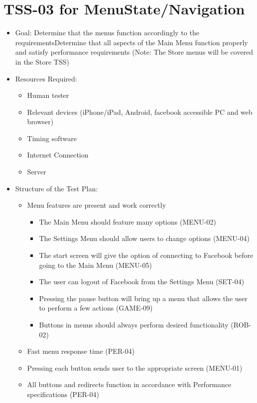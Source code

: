 \section{TSS-03 for MenuState/Navigation}
\begin{itemize}
\item Goal: Determine that the menus function accordingly to the requirementsDetermine that all aspects of the Main Menu function properly and satisfy performance requirements
(Note: The Store menus will be covered in the Store TSS)

\item Resources Required:
\begin{itemize}
\item Human tester
\item Relevant devices (iPhone/iPad, Android, facebook accessible PC and web browser)
\item Timing software
\item Internet Connection 
\item Server
\end{itemize}

\item Structure of the Test Plan: 
\begin{itemize}
\item Menu features are present and work correctly 
\begin{itemize}
\item The Main Menu should feature many options (MENU-02)
\item The Settings Menu should allow users to change options (MENU-04)
\item The start screen will give the option of connecting to Facebook before
going to the Main Menu (MENU-05)
\item The user can logout of Facebook from the Settings Menu (SET-04)
\item Pressing the pause button will bring up a menu that allows the user
to perform a few actions (GAME-09)
\item Buttons in menus should always perform desired functionality (ROB-02)
\end{itemize}
\item Fast menu response time (PER-04)
\item Pressing each button sends user to the appropriate screen (MENU-01)
\item All buttons and redirects function in accordance with Performance specifications (PER-04)
\end{itemize}
\end{itemize}

